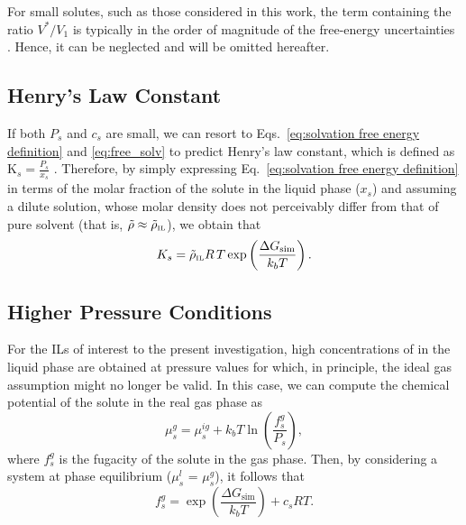 \documentclass[3p,twocolumn]{elsarticle}
\begin{document}
For small solutes, such as those considered in this work, the term containing the ratio $V^{\ast}/V_1$ is typically in the order of magnitude of the free-energy uncertainties \cite{Shirts_2003}.
Hence, it can be neglected and will be omitted hereafter.

\subsection*{Henry's Law Constant}

If both $P_s$ and $c_s$ are small, we can resort to Eqs.~\eqref{eq:solvation free energy definition} and \eqref{eq:free_solv} to predict Henry's law constant, which is defined as $\text{K}_s =\frac{P_s}{x_s}$ \cite{Prausnitz}.
%
Therefore, by simply expressing Eq.~\eqref{eq:solvation free energy definition} in terms of the molar fraction of the solute in the liquid phase ($x_s$) and assuming a dilute solution, whose molar density does not perceivably differ from that of pure solvent (that is, $\tilde{\rho} \approx \tilde{\rho}_\text{\tiny IL}$), we obtain that
\begin{equation}
\label{eq:henry_eq}
K_s = \tilde{\rho}_\text{\tiny IL} R \, T \exp\left(\frac{\Delta G_\text{sim}}{k_b T}\right).
\end{equation}

\subsection*{Higher Pressure Conditions}
\label{sec:partial_pressure}

For the ILs of interest to the present investigation, high concentrations of  in the liquid phase are obtained at pressure values for which, in principle, the ideal gas assumption might no longer be valid.
In this case, we can compute the chemical potential of the solute in the real gas phase as
\begin{equation}
\label{eq:mu_gas_real}
\mu^{g}_s = \mu^{ig}_s + k_b T \ln \left(\frac{f^{g}_s}{P_s}\right),
\end{equation}
where $f^{g}_s$ is the fugacity of the solute in the gas phase.
Then, by considering a system at phase equilibrium ($\mu^{l}_s$ = $\mu^{g}_s$), it follows that
\begin{equation}
\label{eq:fgas_d}
f^{g}_s = \exp \left( \frac{\Delta G_\text{sim}}{k_b T} \right) +  c_s R T. 
\end{equation}
\end{document}
